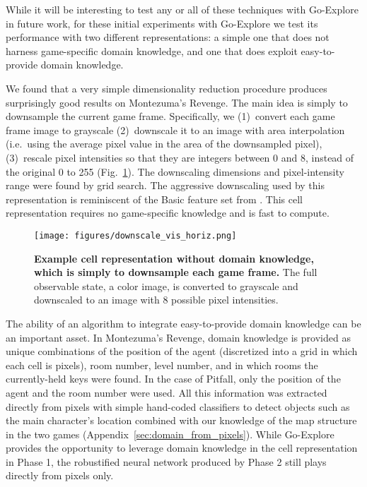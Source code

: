 \documentclass{article}
\begin{document}
While it will be interesting to test any or all of these techniques with Go-Explore in future work, for these initial experiments with Go-Explore we test its performance with two different representations: a simple one that does not harness game-specific domain knowledge, and one that does exploit easy-to-provide domain knowledge. 


We found that a very simple dimensionality reduction procedure produces surprisingly good results on Montezuma's Revenge.
The main idea is simply to downsample the current game frame. Specifically, we (1)~convert each game frame image to grayscale (2)~downscale it to an  image with area interpolation (i.e.\ using the average pixel value in the area of the downsampled pixel), (3)~rescale pixel intensities so that they are integers between 0 and 8, instead of the original 0 to 255 (Fig.~\ref{fig:downscale_vis}). The downscaling dimensions and pixel-intensity range were found by grid search. The aggressive downscaling used by this representation is reminiscent of the Basic feature set from \citet{bellemare2013arcade}. This cell representation requires no game-specific knowledge and is fast to compute. 

\begin{figure}
    \centering
    \texttt{[image: figures/downscale\_vis\_horiz.png]}
    \caption{\textbf{Example cell representation without domain knowledge, which is simply to downsample each game frame.} The full observable state, a color image, is converted to grayscale and downscaled to an  image with 8 possible pixel intensities.}
    \label{fig:downscale_vis}
\end{figure}


The ability of an algorithm to integrate easy-to-provide domain knowledge can be an important asset. In Montezuma's Revenge, domain knowledge is provided as unique combinations of the  position of the agent (discretized into a grid in which each cell is  pixels), room number, level number, and in which rooms the currently-held keys were found. In the case of Pitfall, only the  position of the agent and the room number were used. All this information was extracted directly from pixels with simple hand-coded classifiers to detect objects such as the main character's location combined with our knowledge of the map structure in the two games (Appendix~\ref{sec:domain_from_pixels}). While Go-Explore provides the opportunity to leverage domain knowledge in the cell representation in Phase 1, the robustified neural network produced by Phase 2 still plays directly from pixels only.
\end{document}
